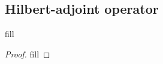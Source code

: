 \subsection{Hilbert-adjoint operator}

\begin{exercise}{1}
fill
\end{exercise}
\begin{proof}
fill
\end{proof}